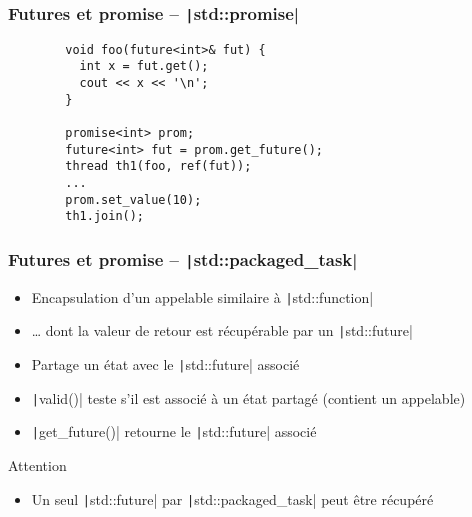 \documentclass[C++.tex]{subfiles}
\begin{document}
\begin{frame}[fragile]
	\frametitle{Futures et promise -- \texttt|std::promise|}
	\begin{verbatim}
		void foo(future<int>& fut) {
		  int x = fut.get();
		  cout << x << '\n';
		}

		promise<int> prom;
		future<int> fut = prom.get_future();
		thread th1(foo, ref(fut));
		...
		prom.set_value(10);
		th1.join();
	\end{verbatim}
\end{frame}

\begin{frame}[fragile]
	\frametitle{Futures et promise -- \texttt|std::packaged_task|}
	\begin{itemize}
		\item Encapsulation d'un appelable similaire à \texttt|std::function|
		\item \ldots{} dont la valeur de retour est récupérable par un \texttt|std::future|
		\item Partage un état avec le \texttt|std::future| associé
		\item \texttt|valid()| teste s'il est associé à un état partagé (contient un appelable)
		\item \texttt|get_future()| retourne le \texttt|std::future| associé
	\end{itemize}

	\begin{alertblock}{Attention}
		\begin{itemize}
			\item Un seul \texttt|std::future| par \texttt|std::packaged_task| peut être récupéré
		\end{itemize}
	\end{alertblock}
\end{frame}
\end{document}
